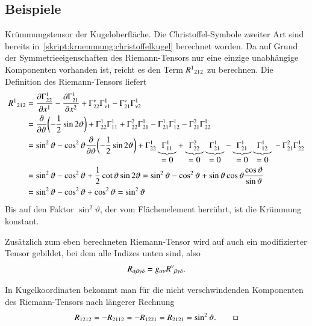 \subsection{Beispiele}

\begin{beispiel}
Krümmungstensor der Kugeloberfläche.
Die Christoffel-Symbole zweiter Art sind bereits
in~\eqref{skript:kruemmung:christoffelkugel}
berechnet worden.
Da auf Grund der Symmetrieeigenschaften des Riemann-Tensors nur eine
einzige unabhängige Komponenten vorhanden ist, reicht es den
Term $R^1\mathstrut_{212}$ zu berechnen.
Die Definition des Riemann-Tensors liefert
\begin{align*}
R^1\mathstrut_{212}
&=
\frac{\partial \Gamma_{22}^1}{\partial x^1}
-
\frac{\partial \Gamma_{21}^1}{\partial x^2}
+
\Gamma_{22}^\nu
\Gamma_{\nu1}^1
-
\Gamma_{21}^\nu
\Gamma_{\nu2}^1
\\
&=
\frac{\partial}{\partial\vartheta}\biggl(-\frac12\sin2\vartheta\biggr)
+
\Gamma_{22}^1
\Gamma_{11}^1
+
\Gamma_{22}^2
\Gamma_{21}^1
-
\Gamma_{21}^1
\Gamma_{12}^1
-
\Gamma_{21}^2
\Gamma_{22}^1
\\
&=
\sin^2\vartheta - \cos^2\vartheta
\frac{\partial}{\partial\vartheta}\biggl(-\frac12\sin2\vartheta\biggr)
+
\Gamma_{22}^1
\underbrace{\Gamma_{11}^1}_{\displaystyle=0}
+
\underbrace{\Gamma_{22}^2}_{\displaystyle=0}
\underbrace{\Gamma_{21}^1}_{\displaystyle=0}
-
\underbrace{\Gamma_{21}^1}_{\displaystyle=0}
\underbrace{\Gamma_{12}^1}_{\displaystyle=0}
\mathstrut
-
\Gamma_{21}^2
\Gamma_{22}^1
\\
&=
\sin^2\vartheta - \cos^2\vartheta
+
\frac12 \cot \vartheta \sin2\vartheta
=
\sin^2\vartheta - \cos^2\vartheta
+
\sin\vartheta\cos\vartheta\frac{\cos\vartheta}{\sin\vartheta}
\\
&=
\sin^2\vartheta - \cos^2\vartheta
+
\cos^2\vartheta
=
\sin^2\vartheta
\end{align*}
Bis auf den Faktor $\sin^2\vartheta$, der vom Flächenelement herrührt,
ist die Krümmung konstant.
\end{beispiel}

Zusätzlich zum eben berechneten Riemann-Tensor wird auf auch ein
modifizierter Tensor gebildet, bei dem alle Indizes unten sind,
also
\[
R_{\alpha\beta\gamma\delta} = g_{\alpha\nu}R^\nu\mathstrut_{\beta\gamma\delta}.
\]

\begin{beispiel}
In Kugelkoordinaten bekommt man für die nicht verschwindenden Komponenten
des Rie\-mann-Tensors nach längerer Rechnung
\[
R_{1212}
=
-R_{2112}
=
-R_{1221}
=
R_{2121}
=
\sin^2\vartheta.
\qedhere
\]
\end{beispiel}

